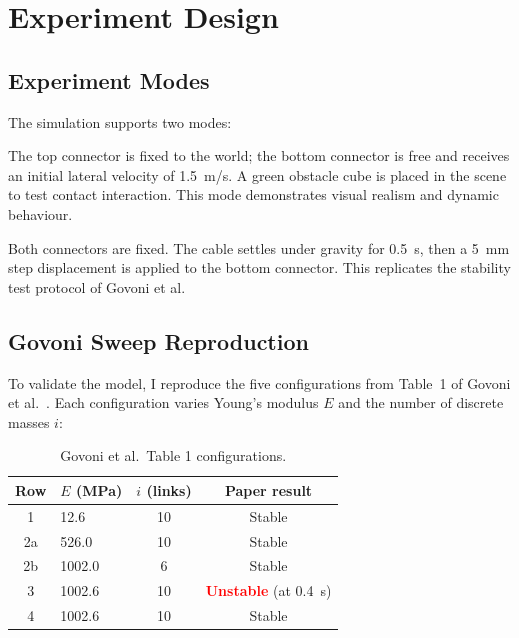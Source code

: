 \documentclass[11pt,a4paper]{article}
\begin{document}
\section{Experiment Design}

\subsection{Experiment Modes}

The simulation supports two modes:
\begin{description}[nosep]
    \item[Hanging kick] The top connector is fixed to the world; the bottom
        connector is free and receives an initial lateral velocity of
        \SI{1.5}{m/s}.  A green obstacle cube is placed in the scene to test
        contact interaction.  This mode demonstrates visual realism and
        dynamic behaviour.
    \item[Both ends fixed (Govoni-style)] Both connectors are fixed.  The cable
        settles under gravity for \SI{0.5}{s}, then a \SI{5}{mm} step
        displacement is applied to the bottom connector.  This replicates the
        stability test protocol of Govoni et al.
\end{description}

\subsection{Govoni Sweep Reproduction}

To validate the model, I reproduce the five configurations from
Table~1 of Govoni et al.~\cite{govoni2025}.  Each configuration varies
Young's modulus $E$ and the number of discrete masses $i$:

\begin{table}[H]
\centering
\caption{Govoni et al.\ Table 1 configurations.}
\label{tab:govoni_configs}
\begin{tabular}{@{}clcc@{}}
\toprule
\textbf{Row} & \textbf{$E$ (MPa)} & \textbf{$i$ (links)} & \textbf{Paper result} \\
\midrule
1  & 12.6   & 10 & Stable \\
2a & 526.0  & 10 & Stable \\
2b & 1002.0 &  6 & Stable \\
3  & 1002.6 & 10 & \textcolor{red}{\textbf{Unstable}} (at \SI{0.4}{s}) \\
4  & 1002.6 & 10 & Stable \\
\bottomrule
\end{tabular}
\end{table}
\end{document}
